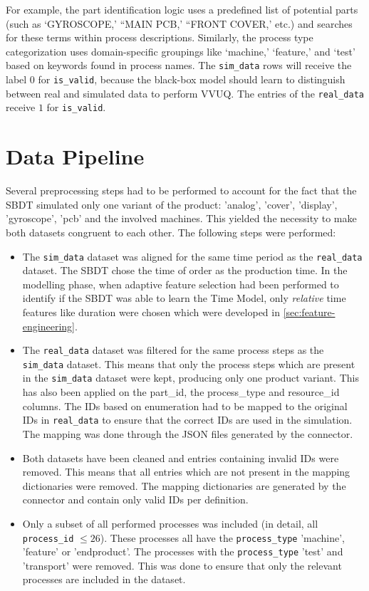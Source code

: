 For example, the part identification logic uses a predefined list of potential parts (such as `GYROSCOPE,' ``MAIN PCB,' ``FRONT COVER,' etc.) and searches for these terms within process descriptions. Similarly, the process type categorization uses domain-specific groupings like `machine,' `feature,' and `test' based on keywords found in process names. The \texttt{sim\_data} rows will receive the label $0$ for \texttt{is\_valid}, because the black-box model should learn to distinguish between real and simulated data to perform VVUQ. The entries of the \texttt{real\_data} receive $1$ for \texttt{is\_valid}.


\section{Data Pipeline}
\label{sec:data-pipeline}

Several preprocessing steps had to be performed to account for the fact that the SBDT simulated only one variant of the product: 'analog', 'cover', 'display', 'gyroscope', 'pcb' and the involved machines. This yielded the necessity to make both datasets congruent to each other. The following steps were performed:

\begin{itemize}
  \item The \texttt{sim\_data} dataset was aligned for the same time period as the \texttt{real\_data} dataset. The SBDT chose the time of order as the production time. In the modelling phase, when adaptive feature selection had been performed to identify if the SBDT was able to learn the Time Model, only \textit{relative} time features like duration were chosen which were developed in \autoref{sec:feature-engineering}.
  \item The \texttt{real\_data} dataset was filtered for the same process steps as the \texttt{sim\_data} dataset. This means that only the process steps which are present in the \texttt{sim\_data} dataset were kept, producing only one product variant. This has also been applied on the part\_id, the process\_type and resource\_id columns. The IDs based on enumeration had to be mapped to the original IDs in \texttt{real\_data} to ensure that the correct IDs are used in the simulation. The mapping was done through the JSON files generated by the connector.
  \item Both datasets have been cleaned and entries containing invalid IDs were removed. This means that all entries which are not present in the mapping dictionaries were removed. The mapping dictionaries are generated by the connector and contain only valid IDs per definition.
  \item Only a subset of all performed processes was included (in detail, all \texttt{process\_id} $\le 26$). These processes all have the \texttt{process\_type} 'machine', 'feature' or 'endproduct'. The processes with the \texttt{process\_type} 'test' and 'transport' were removed. This was done to ensure that only the relevant processes are included in the dataset.
\end{itemize}

